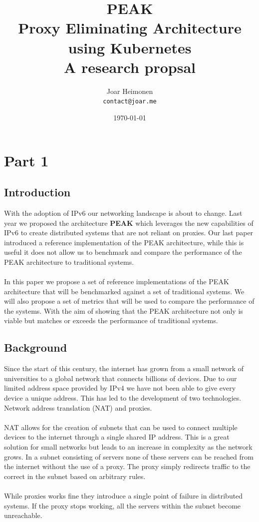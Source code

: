 \documentclass[12pt]{article}
\author{
    Joar Heimonen\\
    \texttt{contact@joar.me}
}
\title{
    \textbf{PEAK}\\[0.5em]
    \large \textbf{P}roxy \textbf{E}liminating \textbf{A}rchitecture using \textbf{K}ubernetes\\[0.3em]
    \large A research propsal
}
\date{\today}
\begin{document}
\maketitle

\pagebreak

\tableofcontents

\pagebreak


\section{Part 1}
\subsection{Introduction}
With the adoption of IPv6 \cite{hindenInternetProtocolVersion1998a} our networking landscape is about to change. Last year we proposed the architecture \textbf{PEAK} \cite{heimonenPreprintPEAKProxy} which leverages the new capabilities of IPv6
to create distributed systems that are not reliant on proxies.
Our last paper introduced a reference implementation of the PEAK architecture, while this is useful it does not allow us to benchmark and compare the performance of 
the PEAK architecture to traditional systems.
\\
\\
In this paper we propose a set of reference implementations of the PEAK architecture that will be benchmarked against a set of traditional systems.
We will also propose a set of metrics that will be used to compare the performance of the systems.
With the aim of showing that the PEAK architecture not only is viable but matches or exceeds the performance of traditional systems.

\subsection{Background}
Since the start of this century, the internet has grown from a small network of universities to a global network that connects billions of devices. Due to our limited
address space provided by IPv4 \cite{InternetProtocol1981} we have not been able to give every device a unique address. This has led to the development of two technologies. Network address translation (NAT) \cite{holdregeIPNetworkAddress1999} and proxies.
\\
\\
NAT allows for the creation of subnets that can be used to connect multiple devices to the internet through a single shared IP address. This is a great solution for small networks
but leads to an increase in complexity as the network grows. In a subnet consisting of servers none of these servers can be reached from the internet without the use of a proxy.
The proxy simply redirects traffic to the correct in the subnet based on arbitrary rules.
\\
\\
While proxies works fine they introduce a single point of failure in distributed systems. If the proxy stops working, all the servers within the subnet become unreachable.
\end{document}
